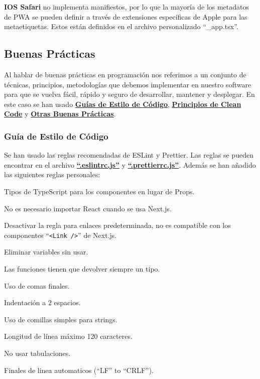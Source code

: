 \documentclass[12pt,twoside,titlepage]{report}
\begin{document}
\textbf{IOS Safari} no implementa manifiestos, por lo que la mayoría de los metadatos de PWA se pueden definir a través de extensiones específicas de Apple para las metaetiquetas. Estos están definidos en el archivo personalizado ``\_app.tsx''.



\subsection{Buenas Prácticas}

Al hablar de buenas prácticas en programación nos referimos a un conjunto de técnicas, principios, metodologías que debemos implementar en nuestro software para que se vuelva fácil, rápido y seguro de desarrollar, mantener y desplegar.
En este caso se han usado \hyperref[sec:estiloCodigo]{\textbf{Guías de Estilo de Código}}, \hyperref[sec:cleancode]{\textbf{Principios de Clean Code}} y \hyperref[sec:otrasPracticas]{\textbf{Otras Buenas Prácticas}}.

\subsubsection{Guía de Estilo de Código}
\label{sec:estiloCodigo}

Se han usado las reglas recomendadas de ESLint y Prettier. Las reglas se pueden encontrar en el archivo \href{https://github.com/alberttogoca/EarFit/blob/main/.eslintrc.js}{\textbf{``.eslintrc.js''}} y \href{https://github.com/alberttogoca/EarFit/blob/main/.prettierrc.js}{\textbf{``.prettierrc.js''}}. Además se han añadido las siguientes reglas personales:

\begin{compactitem}
    \item Tipos de TypeScript para los componentes en lugar de Props.
    \item No es necesario importar React cuando se usa Next.js.
    \item Desactivar la regla para enlaces predeterminada, no es compatible con los componentes ``\texttt{<Link />}'' de Next.js.
    \item Eliminar variables sin usar.
    \item Las funciones tienen que devolver siempre un tipo.
    \item Uso de comas finales.
    \item Indentación a 2 espacios.
    \item Uso de comillas simples para strings.
    \item Longitud de línea máximo 120 caracteres.
    \item No usar tabulaciones.
    \item Finales de linea automaticos (``LF'' to ``CRLF'').
\end{compactitem}
\end{document}
